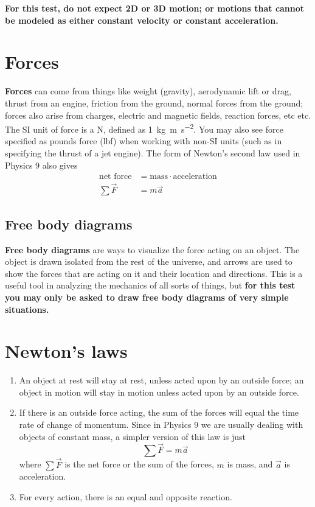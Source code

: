 \documentclass[handout]{tufte-handout}
\begin{document}
\textbf{For this test, do not expect 2D or 3D motion; or motions that cannot be modeled as either constant velocity or constant acceleration.}

\section{Forces}
\textbf{Forces} can come from things like weight (gravity), aerodynamic lift or drag, thrust from an engine, friction from the ground, normal forces from the ground; forces also arise from charges, electric and magnetic fields, reaction forces, etc etc. The SI unit of force is a \si{\newton}, defined as \SI{1}{\kilo\gram\meter\per\second\squared}. You may also see force specified as pounds force (lbf) when working with non-SI units (such as in specifying the thrust of a jet engine). The form of Newton's second law used in Physics 9 also gives 
\begin{align}
\text{net force} &= \text{mass} \cdot \text{acceleration} \\
\sum\vec{F} &= m\vec{a}
\end{align}

\subsection{Free body diagrams}
\textbf{Free body diagrams} are ways to visualize the force acting on an object. The object is drawn isolated from the rest of the universe, and arrows are used to show the forces that are acting on it and their location and directions. This is a useful tool in analyzing the mechanics of all sorts of things, but \textbf{for this test you may only be asked to draw free body diagrams of very simple situations. }

\section{Newton's laws}
\begin{enumerate}
\item An object at rest will stay at rest, unless acted upon by an outside force; an object in motion will stay in motion unless acted upon by an outside force. 
\item If there is an outside force acting, the sum of the forces will equal the time rate of change of momentum. Since in Physics 9 we are usually dealing with objects of constant mass, a simpler version of this law is just
\begin{equation}
\sum\vec{F} = m \vec{a} 
\end{equation}
where $\sum\vec{F}$ is the net force or the sum of the forces, $m$ is mass, and $\vec{a}$ is acceleration. 
\item For every action, there is an equal and opposite reaction. 
\end{enumerate}
\end{document}

